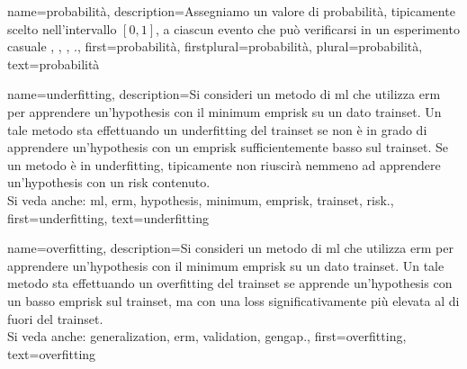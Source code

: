 {name={probabilità}, 
	description={Assegniamo un valore di probabilità, tipicamente scelto 
	nell’intervallo $[0,1]$, a ciascun evento che può verificarsi in un esperimento casuale 
		\cite{BillingsleyProbMeasure}, \cite{BertsekasProb}, \cite{HalmosMeasure},  \cite{KallenbergBook}.},
	first={probabilità},
	firstplural={probabilità},
	plural={probabilità},
	text={probabilità}
}
	
{name={underfitting},
	description={Si consideri 
		un metodo di \gls{ml} che utilizza \gls{erm} per apprendere un'\gls{hypothesis} con il \gls{minimum} \gls{emprisk} 
		su un dato \gls{trainset}. Un tale metodo sta effettuando un underfitting del \gls{trainset} se non è in grado di 
		apprendere un’\gls{hypothesis} con un \gls{emprisk} sufficientemente basso sul \gls{trainset}. 
		Se un metodo è in underfitting, tipicamente non riuscirà nemmeno ad apprendere un'\gls{hypothesis} con 
		un \gls{risk} contenuto.
					\\ 
		Si veda anche: \gls{ml}, \gls{erm}, \gls{hypothesis}, \gls{minimum}, \gls{emprisk}, \gls{trainset}, \gls{risk}.},
	first={underfitting},
	text={underfitting}
}

{name={overfitting},
	description={Si consideri  
		un metodo di \gls{ml} che utilizza \gls{erm} per apprendere un'\gls{hypothesis} con il \gls{minimum} \gls{emprisk} 
		su un dato \gls{trainset}. Un tale metodo sta effettuando un overfitting del \gls{trainset} se apprende 
		un'\gls{hypothesis} con un basso \gls{emprisk} sul \gls{trainset}, ma con una \gls{loss} significativamente più elevata 
		al di fuori del \gls{trainset}.
					\\ 
		Si veda anche: \gls{generalization}, \gls{erm},  \gls{validation}, \gls{gengap}.},
	first={overfitting},
	text={overfitting}
}

